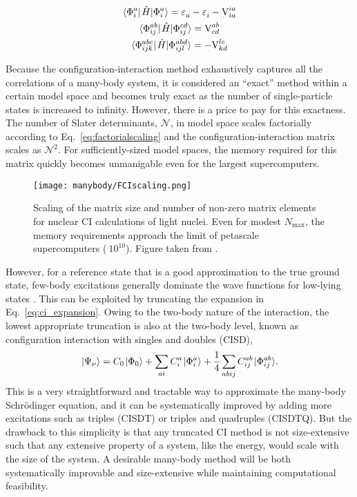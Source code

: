 \documentclass[thesis.tex]{subfiles}
\begin{document}
\begin{gather} \label{eq:slater_condon}
  \element{\Phi^{a}_{i}}{\Ham}{\Phi^{a}_{i}} = \Edenom{}{a} - \Edenom{}{i} - \vint{ia}{ia} \\
  \element{\Phi^{ab}_{ij}}{\Ham}{\Phi^{cd}_{ij}} = \vint{ab}{cd} \\
  \element{\Phi^{abc}_{ijk}}{\Ham}{\Phi^{abd}_{ijl}} = -\vint{lc}{kd}
\end{gather}

Because the configuration-interaction method exhaustively captures all the correlations of a many-body system, it is considered an ``exact'' method within a certain model space and becomes truly exact as the number of single-particle states is increased to infinity.  However, there is a price to pay for this exactness.  The number of Slater determinants, $\mathcal{N}$, in model space scales factorially according to Eq.\ \eqref{eq:factorialscaling} and the configuration-interaction matrix scales as $\mathcal{N}^{2}$.  For sufficiently-sized model spaces, the memory required for this matrix quickly becomes unmanigable even for the largest supercomputers.
\begin{figure}
  \centering
  \texttt{[image: manybody/FCIscaling.png]}
  \caption{Scaling of the matrix size and number of non-zero matrix elements for nuclear CI calculations of light nuclei.  Even for modest $N_{\text{max}}$, the memory requirements approach the limit of petascale supercomputers ($~10^{10}$).  Figure taken from \cite{SHAO2016}.}
  \label{fig:fciscaling}
\end{figure}

However, for a reference state that is a good approximation to the true ground state, few-body excitations generally dominate the wave functions for low-lying states \cite{SHERRILL1999143}.  This can be exploited by truncating the expansion in Eq.\ \eqref{eq:ci_expansion}.  Owing to the two-body nature of the interaction, the lowest appropriate truncation is also at the two-body level, known as configuration interaction with singles and doubles (CISD),
\begin{equation} \label{eq:cisd_expansion}
  \ket{\Psi_{\nu}} = C_{0}\ket{\Phi_{0}} + \sum_{\mathclap{a i}} C^{a}_{i}\ket{\Phi^{a}_{i}} + \frac{1}{4}\sum_{\mathclap{a b i j}} C^{ab}_{ij}\ket{\Phi^{ab}_{ij}}.
\end{equation}
This is a very straightforward and tractable way to approximate the many-body Schr\"{o}dinger equation, and it can be systematically improved by adding more excitations such as triples (CISDT) or triples and quadruples (CISDTQ).  But the drawback to this simplicity is that any truncated CI method is not size-extensive such that any extensive property of a system, like the energy, would scale with the size of the system.  A desirable many-body method will be both systematically improvable and size-extensive while maintaining computational feasibility.
\end{document}
